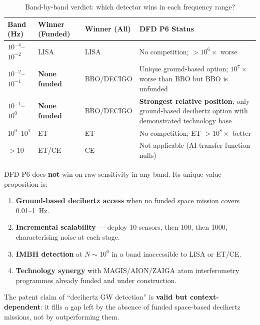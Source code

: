 \documentclass[11pt]{article}
\theoremstyle{definition}
\theoremstyle{remark}
\begin{document}
\begin{table}[H]
\centering
\caption{Band-by-band verdict: which detector wins in each frequency range?}
\label{tab:P6-band-verdict}
\begin{tabular}{@{}p{2.5cm}p{3cm}p{3cm}p{5cm}@{}}
\toprule
Band (Hz) & Winner (Funded) & Winner (All) & DFD P6 Status \\
\midrule
$10^{-4}$--$10^{-2}$
  & LISA & LISA
  & No competition; $>10^{6}\times$ worse \\[4pt]
$10^{-2}$--$10^{-1}$
  & \textbf{None funded} & BBO/DECIGO
  & Unique ground-based option; $10^{7}\times$ worse than BBO
    but BBO is unfunded \\[4pt]
$10^{-1}$--$10^{0}$
  & \textbf{None funded} & BBO/DECIGO
  & \textbf{Strongest relative position}; only ground-based
    decihertz option with demonstrated technology base \\[4pt]
$10^{0}$--$10^{1}$
  & ET & ET
  & No competition; ET $>10^{8}\times$ better \\[4pt]
$> 10$
  & ET/CE & CE
  & Not applicable (AI transfer function nulls) \\
\bottomrule
\end{tabular}
\end{table}

\begin{tcolorbox}[colback=green!5!white, colframe=green!40!black,
  title=\textbf{P6 Decihertz Verdict: Strongest Claim is Technology Accessibility}]
DFD P6 does \textbf{not} win on raw sensitivity in any band. Its unique
value proposition is:
\begin{enumerate}[nosep]
\item \textbf{Ground-based decihertz access} when no funded space mission
  covers 0.01--1~Hz.
\item \textbf{Incremental scalability} --- deploy 10 sensors, then 100,
  then 1000, characterising noise at each stage.
\item \textbf{IMBH detection} at $N \sim 10^6$ in a band inaccessible to
  LISA or ET/CE.
\item \textbf{Technology synergy} with MAGIS/AION/ZAIGA atom interferometry
  programmes already funded and under construction.
\end{enumerate}
The patent claim of ``decihertz GW detection'' is \textbf{valid but
context-dependent}: it fills a gap left by the absence of funded
space-based decihertz missions, not by outperforming them.
\end{tcolorbox}
\end{document}
